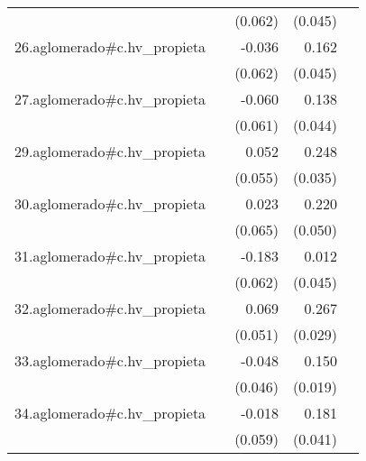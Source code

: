 {\begin{longtable}{l*{4}{D{.}{.}{-1}}}
            &                     &     (0.062)         &     (0.045)         &                     \\
\addlinespace
26.aglomerado#c.hv\_propieta&                     &      -0.036         &       0.162\sym{***}&                     \\
            &                     &     (0.062)         &     (0.045)         &                     \\
\addlinespace
27.aglomerado#c.hv\_propieta&                     &      -0.060         &       0.138\sym{**} &                     \\
            &                     &     (0.061)         &     (0.044)         &                     \\
\addlinespace
29.aglomerado#c.hv\_propieta&                     &       0.052         &       0.248\sym{***}&                     \\
            &                     &     (0.055)         &     (0.035)         &                     \\
\addlinespace
30.aglomerado#c.hv\_propieta&                     &       0.023         &       0.220\sym{***}&                     \\
            &                     &     (0.065)         &     (0.050)         &                     \\
\addlinespace
31.aglomerado#c.hv\_propieta&                     &      -0.183\sym{**} &       0.012         &                     \\
            &                     &     (0.062)         &     (0.045)         &                     \\
\addlinespace
32.aglomerado#c.hv\_propieta&                     &       0.069         &       0.267\sym{***}&                     \\
            &                     &     (0.051)         &     (0.029)         &                     \\
\addlinespace
33.aglomerado#c.hv\_propieta&                     &      -0.048         &       0.150\sym{***}&                     \\
            &                     &     (0.046)         &     (0.019)         &                     \\
\addlinespace
34.aglomerado#c.hv\_propieta&                     &      -0.018         &       0.181\sym{***}&                     \\
            &                     &     (0.059)         &     (0.041)         &                     \\

\end{longtable}}
